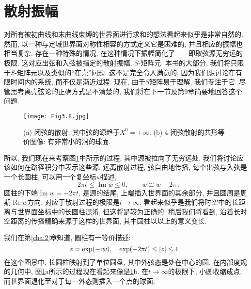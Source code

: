 \section{\texorpdfstring{散射振幅}{3.5 Scattering amplitudes}} \label{sec:3.5}

对所有被初曲线和末曲线束缚的世界面进行求和的想法看起来似乎是非常自然的. 然而, 以一种与定域世界面对称性相容的方式定义它是困难的, 并且相应的振幅也相当复杂. 存在一种特殊的情况, 在这种情况下振幅简化了——即取弦源无穷远的极限. 这对应出弦和入弦被指定的散射振幅, $S$-矩阵元. 本书的大部分, 我们将只限于$S$-矩阵元以及类似的“在壳”问题. 这不是完全令人满意的, 因为我们想讨论在有限时间内的系统, 而不仅是渐近过程. 现在, 由于$S$矩阵易于理解, 我们专注于它. 尽管思考离壳弦论的正确方式是不清楚的, 我们将在下一节及第9章简要地回答这个问题.

\begin{figure}[h]
	\begin{center}
		\texttt{[image: Fig3.8.jpg]}\\
		\caption{(a) 闭弦的散射, 其中弦的源趋于$X^{0}=\pm \infty$. (b) 4-闭弦散射的共形等价图像: 有非常小的洞的球面.}\label{Fig3.8}
	\end{center}
\end{figure}

所以, 我们现在来考察图\ref{Fig3.8}中所示的过程, 其中源被拉向了无穷远处. 我们将讨论应该如何在路径积分中表示这些源. 远离散射过程, 弦自由地传播, 每个出弦与入弦是一个长圆柱, 可以用一个复坐标$w$描述,
\begin{equation}
-2 \pi t \leq \operatorname{Im} w \leq 0, \qquad w \cong w+2 \pi \:. \label{3.5.1}
\end{equation}
圆柱的下端$\operatorname{Im} w=-2 \pi t$, 是源的结尾, 上端插入世界面的其余部分, 并且圆周是周期$\operatorname{Re} w$方向. 对应于散射过程的极限是$t \rightarrow \infty$. 看起来似乎是我们将时空中的长距离与世界面坐标中的长圆柱混淆, 但这将是较为正确的: 稍后我们将看到, 沿着长时空距离的传播精确来源于这样的世界面, 其中圆柱以以上的意义变长.

我们在第\ref{cha:2}章知道, 圆柱有一等价描述: 
\begin{equation}
z=\exp (-\mathrm{i} w), \quad \exp (-2 \pi t) \leq|z| \leq 1 \:. \label{3.5.2}
\end{equation}
在这个图景中, 长圆柱映射到了单位圆盘, 其中外弦态是处在中心的圆. 在内部度规的几何中, 图\ref{Fig3.8}a所示的过程现在看起来像是\ref{Fig3.8}b. 在$t \rightarrow \infty$的极限下, 小圆收缩成点, 而世界面退化至对于每一外态则插入一个点的球面.


